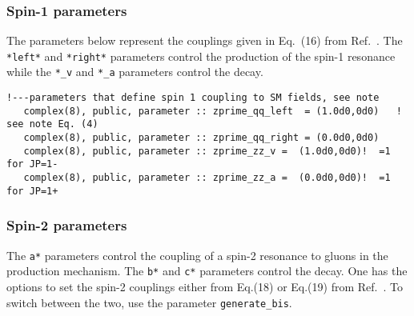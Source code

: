 \documentclass[aps,superscriptaddress,nofootinbib]{revtex4}
\begin{document}
\subsubsection{ Spin-1 parameters }

The parameters below represent the couplings given in Eq.~(16) from Ref.~\cite{Bolognesi:2012}. The \verb|*left*| and \verb|*right*| parameters control the production of the spin-1 resonance while the \verb|*_v| and \verb|*_a| parameters control the decay.

\begin{verbatim}
!---parameters that define spin 1 coupling to SM fields, see note
   complex(8), public, parameter :: zprime_qq_left  = (1.0d0,0d0)   !  see note Eq. (4)
   complex(8), public, parameter :: zprime_qq_right = (0.0d0,0d0) 
   complex(8), public, parameter :: zprime_zz_v =  (1.0d0,0d0)!  =1 for JP=1-
   complex(8), public, parameter :: zprime_zz_a =  (0.0d0,0d0)!  =1 for JP=1+
\end{verbatim}   

\subsubsection{ Spin-2 parameters }

\noindent
The \verb|a*| parameters control the coupling of a spin-2 resonance to gluons in the production mechanism.  The \verb|b*| and \verb|c*| parameters control the decay.
One has the options to set the spin-2 couplings either from Eq.(18) or Eq.(19) from Ref.~\cite{Bolognesi:2012}.  To switch between the two, use the parameter \verb|generate_bis|.
\end{document}
